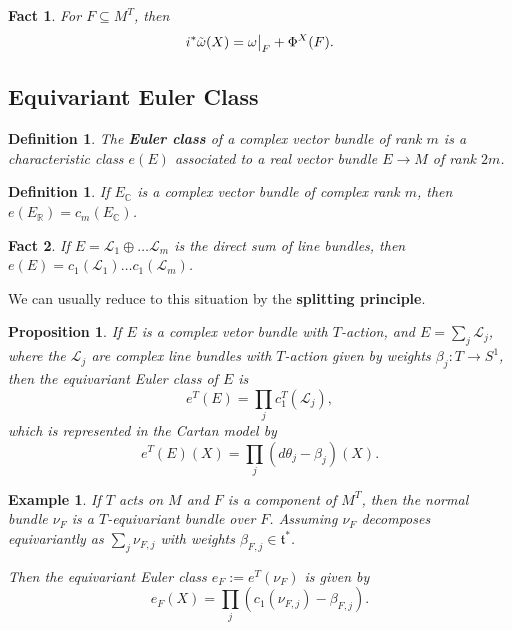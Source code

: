 \documentclass{article}
\newtheorem{prop}[theorem]{Proposition}
\newtheorem{defn}[theorem]{Definition\rm}
\newtheorem{example}{Example}
\newtheorem{fact}{Fact}
\newcommand{\ra}{\rightarrow}
\newcommand{\w}{\omega}
\newcommand{\RR}{\mathbb{R}}
\newcommand{\CC}{\mathbb{C}}
\newcommand{\mcL}{\mathcal{L}}
\newcommand{\mft}{\mathfrak{t}}
\newcommand\restr[2]{{%
		\left.\kern-\nulldelimiterspace %
		#1 %
		\vphantom{\big|} %
		\right|_{#2} %
}}
\begin{document}
\begin{fact}
	For $F \subseteq M^{T}$, then
	\begin{equation*}
		i^{\ast}\tilde{\w}(X) = \restr{\w}{F} + \Phi^{X}(F).
	\end{equation*}
\end{fact}

\subsection{Equivariant Euler Class}

\begin{defn}
	The \textbf{Euler class} of a complex vector bundle of rank $m$ is a characteristic class $e(E)$ associated to a real vector bundle $E \ra M$ of rank $2m$.
\end{defn}

\begin{defn}
	If $E_{\CC}$ is a complex vector bundle of complex rank $m$, then $e(E_{\RR}) = c_{m}(E_{\CC})$.
\end{defn}

\begin{fact}
	If $E = \mcL_{1} \oplus \ldots \mcL_{m}$ is the direct sum of line bundles, then $e(E) = c_{1}(\mcL_{1})\ldots c_{1}(\mcL_{m})$.
\end{fact}

We can usually reduce to this situation by the \textbf{splitting principle}.

\begin{prop}
	If $E$ is a complex vetor bundle with $T$-action, and $E = \sum_{j} \mcL_{j}$, where the $\mcL_{j}$ are complex line bundles with $T$-action given by weights $\beta_{j} : T \ra S^{1}$, then the equivariant Euler class of $E$ is
	\begin{equation*}
		e^{T}(E) = \prod_{j} c_{1}^{T}(\mcL_{j}),
	\end{equation*}
	which is represented in the Cartan model by
	\begin{equation*}
		e^{T}(E)(X) = \prod_{j}(d\theta_{j} - \beta_{j})(X).
	\end{equation*}
\end{prop}

\begin{example}
	If $T$ acts on $M$ and $F$ is a component of $M^{T}$, then the normal bundle $\nu_{F}$ is a $T$-equivariant bundle over $F$. Assuming $\nu_{F}$ decomposes equivariantly as $\sum_{j} \nu_{F,j}$ with weights $\beta_{F,j} \in \mft^{\ast}$.
	
	Then the equivariant Euler class $e_{F} := e^{T}(\nu_{F})$ is given by
	\begin{equation*}
		e_{F}(X) = \prod_{j}(c_{1}(\nu_{F,j}) - \beta_{F,j}).
	\end{equation*}
\end{example}
\end{document}
